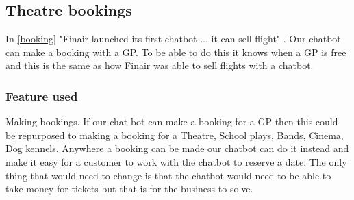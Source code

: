 \documentclass{article}
\begin{document}
\subsection{Theatre bookings}
In \ref{booking} "Finair launched its first chatbot ... it can sell flight" \cite{booking}. Our chatbot can make a booking with a GP. To be able to do this it knows when a GP is free and  this is the same as how Finair was able to sell flights with a chatbot. 
\subsubsection{Feature used}
Making bookings. If our chat bot can make a booking for a GP then this could be repurposed to making a booking for a Theatre, School plays, Bands, Cinema, Dog kennels.
Anywhere a booking can be made our chatbot can do it instead and make it easy for a customer to work with the chatbot to reserve a date. The only thing that would need to change is that the chatbot would need to be able to take money for tickets but that is for the business to solve.


\end{document}

